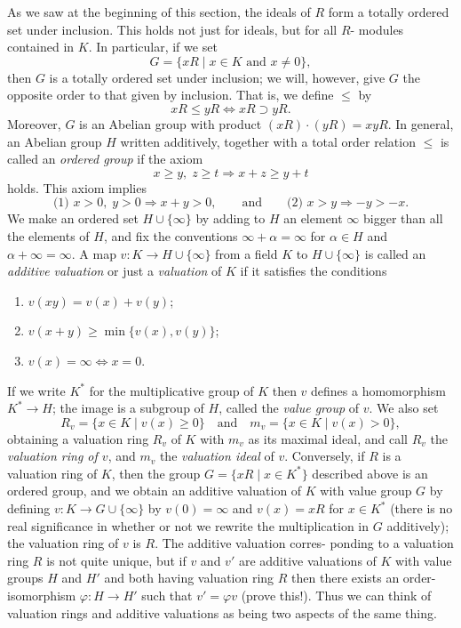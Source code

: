 As we saw at the beginning of this section, the ideals of $R$ form a totally
ordered set under inclusion. This holds not just for ideals, but for all $R$-
modules contained in $K$. In particular, if we set
\[
  G = \{xR \mid x \in K \text{ and } x \neq 0\},
\]
then $G$ is a totally ordered set under inclusion; we will, however, give $G$ the
opposite order to that given by inclusion. That is, we define $\le$ by
\[
  xR \le yR \iff xR \supset yR.
\]
Moreover, $G$ is an Abelian group with product $(xR) \cdot (yR) = xyR$. In general,
an Abelian group $H$ written additively, together with a total order relation
$\le$ is called an \emph{ordered group} if the axiom
\[
  x \ge y, \; z \ge t \Rightarrow x + z \ge y + t
\]
holds. This axiom implies
\[
  \text{(1) } x > 0, \; y > 0 \Rightarrow x + y > 0, \qquad \text{and} \qquad \text{(2) } x > y \Rightarrow -y > -x.
\]
We make an ordered set $H \cup \{\infty\}$ by adding to $H$ an element $\infty$ bigger
than all the elements of $H$, and fix the conventions $\infty + \alpha = \infty$ for $\alpha \in H$
and $\alpha + \infty = \infty$. A map $v\colon K \to H \cup \{\infty\}$ from a field $K$ to $H \cup \{\infty\}$
is called an \emph{additive valuation} or just a \emph{valuation} of $K$ if it satisfies the
conditions
\begin{enumerate}[(1)]
  \item $v(xy) = v(x) + v(y)$;
  \item $v(x + y) \ge \min\{v(x), v(y)\}$;
  \item $v(x) = \infty \iff x = 0$.
\end{enumerate}
If we write $K^*$ for the multiplicative group of $K$ then $v$ defines a
homomorphism $K^* \to H$; the image is a subgroup of $H$, called the \emph{value group} of $v$. We also set
\[
  R_v = \{x \in K \mid v(x) \ge 0\} \quad \text{and} \quad m_v = \{x \in K \mid v(x) > 0\},
\]
obtaining a valuation ring $R_v$ of $K$ with $m_v$ as its maximal ideal, and call $R_v$ the
\emph{valuation ring of $v$}, and $m_v$ the \emph{valuation ideal} of $v$. Conversely, if $R$ is a
valuation ring of $K$, then the group $G = \{xR \mid x \in K^*\}$ described above is an
ordered group, and we obtain an additive valuation of $K$ with value group
$G$ by defining $v\colon K \to G \cup \{\infty\}$ by $v(0) = \infty$ and $v(x) = xR$ for $x \in K^*$ (there
is no real significance in whether or not we rewrite the multiplication in
$G$ additively); the valuation ring of $v$ is $R$. The additive valuation corres-
ponding to a valuation ring $R$ is not quite unique, but if $v$ and $v'$ are
additive valuations of $K$ with value groups $H$ and $H'$ and both having
valuation ring $R$ then there exists an order-isomorphism
$\varphi\colon H \to H'$ such that $v' = \varphi v$ (prove this!). Thus we can think of valuation rings and
additive valuations as being two aspects of the same thing.

